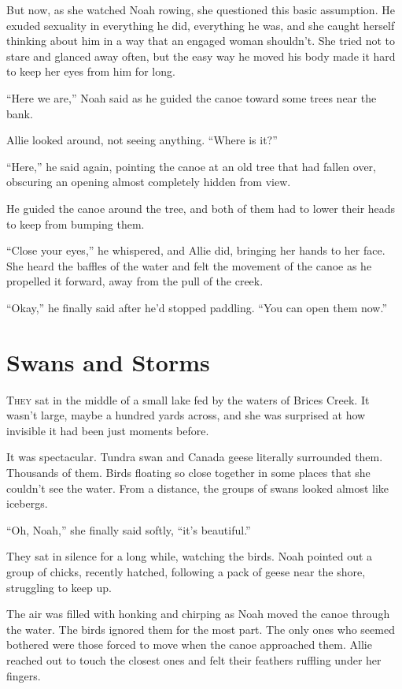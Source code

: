 \documentclass[10pt, twoside, openright]{book}
\newcommand{\chapterornament}[1]{\def\currentornament{#1}}
\def\currentornament{}
\begin{document}
But now, as she watched Noah rowing, she questioned this basic
assumption. He exuded sexuality in everything he did, everything he was,
and she caught herself thinking about him in a way that an engaged woman
shouldn't. She tried not to stare and glanced away often, but the easy
way he moved his body made it hard to keep her eyes from him for long.

``Here we are,'' Noah said as he guided the canoe toward some trees near
the bank.


Allie looked around, not seeing anything. ``Where is it?''


``Here,'' he said again, pointing the canoe at an old tree that had
fallen over, obscuring an opening almost completely hidden from view.

He guided the canoe around the tree, and both of them had to lower their
heads to keep from bumping them.

``Close your eyes,'' he whispered, and Allie did, bringing her hands to
her face. She heard the baffles of the water and felt the movement of
the canoe as he propelled it forward, away from the pull of the creek.

``Okay,'' he finally said after he'd stopped paddling. ``You can open
them now.''

		\newpage
\thispagestyle{empty}
\clearpage
\null
\chapterornament{89}
\chapter{Swans and Storms}

\lettrine[findent=0.5em, nindent=0.0em]{T}{hey} sat in the middle of a small lake fed by the waters of Brices
Creek. It wasn't large, maybe a hundred yards across, and she was
surprised at how invisible it had been just moments before.

It was spectacular. Tundra swan and Canada geese literally surrounded
them. Thousands of them. Birds floating so close together in some places
that she couldn't see the water. From a distance, the groups of swans
looked almost like icebergs.


``Oh, Noah,'' she finally said softly, ``it's beautiful.''


They sat in silence for a long while, watching the birds. Noah pointed
out a group of chicks, recently hatched, following a pack of geese near
the shore, struggling to keep up.

The air was filled with honking and chirping as Noah moved the canoe
through the water. The birds ignored them for the most part. The only
ones who seemed bothered were those forced to move when the canoe
approached them. Allie reached out to touch the closest ones and felt
their feathers ruffling under her fingers.
\end{document}
